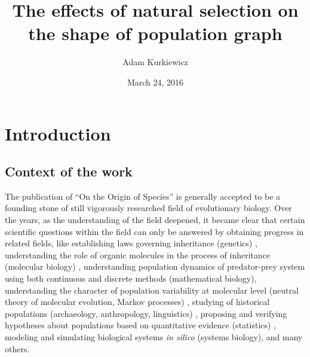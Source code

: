 \documentclass{l4proj}
\newif\ifdebug
\begin{document}
\title{The effects of natural selection on the shape of population graph}
\author{Adam Kurkiewicz}
\date{March 24, 2016}
\maketitle

\begin{abstract}
\ifdebug
  Placeholder for the abstract, which will be written at the end.
\fi

\end{abstract}

\educationalconsent
%
%
\tableofcontents
\chapter{Introduction}
\label{intro}

\ifdebug
  Introduction. This should place the work in context and will be developed from the introduction produced for assessment.
\fi


\section{Context of the work}

The publication of ``On the Origin of Species'' \parencite{darwin59} is generally accepted to be a founding stone of still vigorously researched field of evolutionary biology. Over the years, as the understanding of the field deepened, it became clear that certain scientific questions within the field can only be answered by obtaining progress in related fields, like establishing laws governing inheritance (genetics) \parencite{mendel}, understanding the role of organic molecules in the process of inheritance (molecular biology) \parencite{watson53}, understanding population dynamics of predator-prey system using both continuous and discrete methods (mathematical biology), understanding the character of population variability at molecular level (neutral theory of molecular evolution, Markov processes) \parencite{kimura68, dayhoff73}, studying of historical populations (archaeology, anthropology, linguistics) \parencite{dubois}, proposing and verifying hypotheses about populations based on quantitative evidence (statistics) \parencite{bronzeAgeEurasia}, modeling and simulating biological systems \textit{in silico} (systems biology), and many others.
\end{document}
